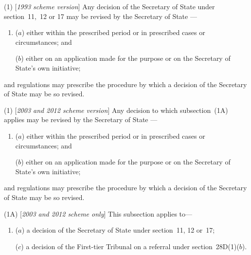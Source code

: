 \documentclass[12pt,a4paper]{article}
\begin{document}
(1) [\emph{1993 scheme version}] Any decision of the 
Secretary of State  %
under section~11,~12 or 17 may be revised by the 
Secretary of State%
—
\begin{enumerate}\item[]
($a$) either within the prescribed period or in prescribed cases or circumstances; and

($b$) either on an application made for the purpose or on 
the Secretary of State's  %
own initiative;
\end{enumerate}
and regulations may prescribe the procedure by which a decision of the 
Secretary of State  %
may be so revised.

(1) [\emph{2003 and 2012 scheme version}] Any decision 
to which subsection~(1A)  applies  %
may be revised by the 
Secretary of State%
—
\begin{enumerate}\item[]
($a$) either within the prescribed period or in prescribed cases or circumstances; and

($b$) either on an application made for the purpose or on 
the Secretary of State's  %
own initiative;
\end{enumerate}
and regulations may prescribe the procedure by which a decision of the 
Secretary of State  %
may be so revised.

(1A) [\emph{2003 and 2012 scheme only}] This subsection applies to—
\begin{enumerate}\item[]
($a$) a decision of the 
Secretary of State  %
under section~11, 12 or~17;


\begin{sloppypar}
($c$) a decision of 
the First-tier Tribunal  %
on a referral under section~28D(1)($b$).
\end{sloppypar}
\end{enumerate}
\end{document}
